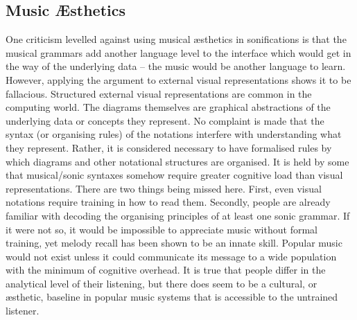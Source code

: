 \documentclass{article}
\begin{document}
\subsection{Music Æsthetics}
One criticism levelled against using musical æsthetics in sonifications is that the musical grammars add another language level to the interface which would get in the way of the underlying data -- the music would be another language to learn. However, applying the argument to external visual representations shows it to be fallacious. Structured external visual representations are common in the computing world. The diagrams themselves are graphical abstractions of the underlying data or concepts they represent. No complaint is made that the syntax (or organising rules) of the notations interfere with understanding what they represent. Rather, it is considered necessary to have formalised rules by which diagrams and other notational structures are organised. It is held by some that musical/sonic syntaxes somehow require greater cognitive load than visual representations. There are two things being missed here. First, even visual notations require training in how to read them. Secondly, people are already familiar with decoding the organising principles of at least one sonic grammar. If it were not so, it would be impossible to appreciate music without formal training, yet melody recall has been shown to be an innate skill. Popular music would not exist unless it could communicate its message to a wide population with the minimum of cognitive overhead. It is true that people differ in the analytical level of their listening, but there does seem to be a cultural, or æsthetic, baseline in popular music systems that is accessible to the untrained listener.
\end{document}
